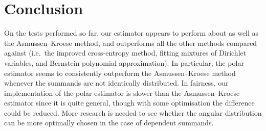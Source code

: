 \section{Conclusion} \label{Sec:Conclusion}

On the tests performed so far, our estimator appears to perform about as well as the Asmussen--Kroese method, and outperforms all the other methods compared against (i.e.\ the improved cross-entropy method, fitting mixtures of Dirichlet variables, and Bernstein polynomial approximation). In particular, the polar estimator seems to consistently outperform the Asmussen--Kroese method whenever the summands are not identically distributed. In fairness, our implementation of the polar estimator is slower than the Asmussen--Kroese estimator since it is quite general, though with some optimisation the difference could be reduced. More research is needed to see whether the angular distribution can be more optimally chosen in the case of dependent summands.